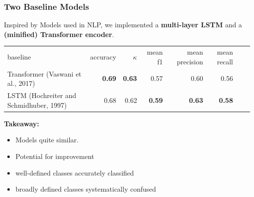 \documentclass[%
  aspectratio=169,
  9pt,
  USenglish,
  titlegraphic, %
  affiliationintitlepagehead,
  affiliation,
]{beamer}
\begin{document}
\begin{frame}
	\frametitle{Two Baseline Models}
	
	\Large
	Inspired by Models used in NLP, we implemented a \textbf{multi-layer LSTM} and a \textbf{(minified) Transformer encoder}.
	
	\vspace{1em}
	\normalsize
	
		\begin{tabular}{lrrrrrrr}
			\toprule
			baseline & accuracy & $\kappa$ & mean f1 & mean precision  & mean recall \\
			\cmidrule(lr){1-1}\cmidrule(lr){2-2}\cmidrule(lr){3-3}\cmidrule(lr){4-4}\cmidrule(lr){5-5}\cmidrule(lr){6-6}\cmidrule(lr){7-7}
			Transformer {\small (Vaswani et al., 2017)} & \textbf{0.69}  &  \textbf{0.63} & 0.57 & {0.60} & 0.56 \\
			LSTM {\small (Hochreiter and Schmidhuber, 1997)} & 0.68 & 0.62 & \textbf{0.59} & \textbf{0.63} & \textbf{0.58} \\
			\bottomrule
		\end{tabular}
	
	\vspace{1em}
	
	\Large
	\textbf{Takeaway:} 
	\begin{itemize}
		\item Models quite similar.
		\item Potential for improvement
		\item well-defined classes accurately classified
		\item broadly defined classes systematically confused
	\end{itemize}
	
\end{frame}
\end{document}
